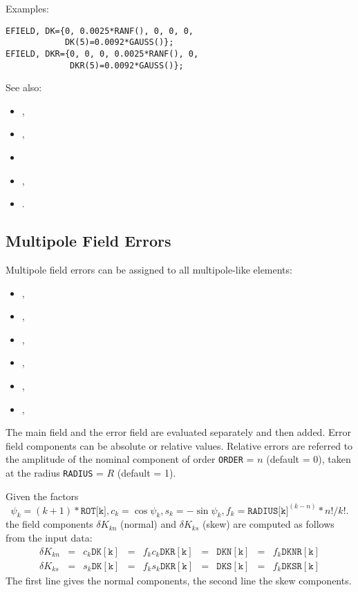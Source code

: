 Examples:
\begin{verbatim}
EFIELD, DK={0, 0.0025*RANF(), 0, 0, 0, 
            DK(5)=0.0092*GAUSS()};
EFIELD, DKR={0, 0, 0, 0.0025*RANF(), 0, 
             DKR(5)=0.0092*GAUSS()};
\end{verbatim}
See also: 
\begin{itemize}
\item {},
\item {},
\item {}
\item {},
\item {}.
\end{itemize}

\subsection{Multipole Field Errors}
\label{sec:errormulti}
Multipole field errors can be assigned to all multipole-like elements:
\begin{itemize}
\item {},
\item {},
\item {},
\item {},
\item {},
\item {},
\end{itemize}
The main field and the error field are evaluated separately and then added.
Error field components can be absolute or relative values.
Relative errors are referred to the amplitude of the nominal component 
of order \texttt{ORDER} = $n$ (default = 0), 
taken at the radius \texttt{RADIUS} = $R$ (default = 1).

Given the factors
\[
\psi_k = (k + 1) * \texttt{ROT[k]}, 
c_k = \cos \psi_k, 
s_k = - \sin \psi_k, 
f_k = \texttt{RADIUS[k]}^(k-n) * n! / k!.
\]
the field components 
$\delta K_{kn}$ (normal) and $\delta K_{ks}$ (skew) 
are computed as follows from the input data:
\[
\begin{array}{lclclclcl}
  \delta K_{kn} &=& c_k \mathtt{DK[k]} &=& f_k c_k \mathtt{DKR[k]} &=&
  \mathtt{DKN[k]} &=& f_k \mathtt{DKNR[k]} \\
  \delta K_{ks} &=& s_k \mathtt{DK[k]} &=& f_k s_k \mathtt{DKR[k]} &=&
  \mathtt{DKS[k]} &=& f_k \mathtt{DKSR[k]}
\end{array}
\]
The first line gives the normal components, 
the second line the skew components.

